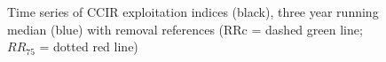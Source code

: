 \documentclass[11pt]{article}
\newcommand{\e}{\string~/bio.data/bio.lobster/figures/} %
\newcommand{\ebh}{\string~/bio.data/bio.lobster/figures/LFA3438Framework2019/} %
\begin{document}
%
%
%
%
%
%
%                    
%
%

    \begin{figure}
    \centering
        \caption{Time series of CCIR exploitation indices (black), three year running median (blue) with removal references (RRc = dashed green line; $RR_{75}$ = dotted red line)}

    \end{figure}
\end{document}
